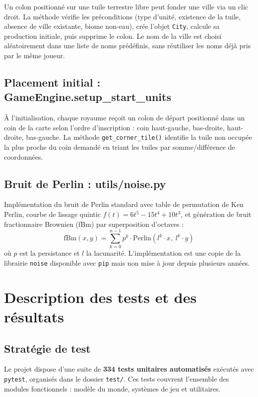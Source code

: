 \documentclass[12pt, a4paper]{article}
\begin{document}
Un colon positionné sur une tuile terrestre libre peut fonder une ville via un clic droit.
La méthode vérifie les préconditions (type d'unité, existence de la tuile, absence de ville
existante, biome non-eau), crée l'objet \texttt{City}, calcule sa production initiale, puis
supprime le colon. Le nom de la ville est choisi aléatoirement dans une liste de noms
prédéfinis, sans réutiliser les noms déjà pris par le même joueur.

\subsection{Placement initial : GameEngine.setup\_start\_units}

À l'initialisation, chaque royaume reçoit un colon de départ positionné dans un coin de la
carte selon l'ordre d'inscription : coin haut-gauche, bas-droite, haut-droite, bas-gauche.
La méthode \texttt{get\_corner\_tile()} identifie la tuile non occupée la plus proche du coin
demandé en triant les tuiles par somme/différence de coordonnées.

\subsection{Bruit de Perlin : utils/noise.py}

Implémentation du bruit de Perlin standard avec table de permutation de Ken Perlin,
courbe de lissage quintic $f(t) = 6t^5 - 15t^4 + 10t^3$, et génération de bruit fractionnaire
Brownien (fBm) par superposition d'octaves :
\begin{equation}
    \text{fBm}(x, y) = \sum_{k=0}^{n-1} p^k \cdot \text{Perlin}\!\left(l^k \cdot x,\; l^k \cdot y\right)
\end{equation}
où $p$ est la persistance et $l$ la lacunarité. L'implémentation est une copie de la librairie \verb|noise|\cite{duncan_noise} disponible avec \verb|pip| mais non mise à jour depuis plusieurs années.



\section{Description des tests et des résultats}


\subsection{Stratégie de test}

Le projet dispose d'une suite de \textbf{334 tests unitaires automatisés} exécutés avec
\texttt{pytest}, organisés dans le dossier \texttt{test/}. Ces tests couvrent l'ensemble
des modules fonctionnels : modèle du monde, systèmes de jeu et utilitaires.
\end{document}
